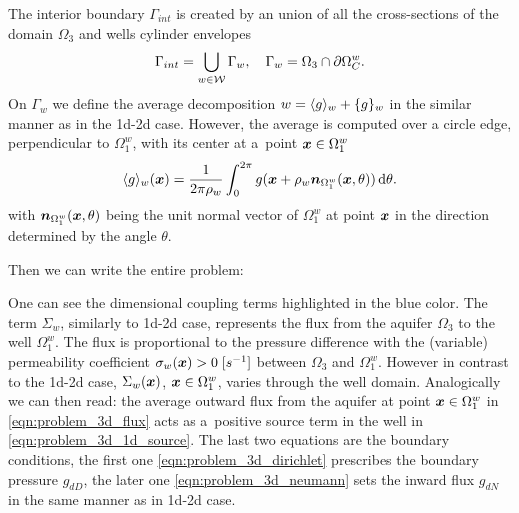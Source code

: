 The interior boundary $\Gamma_{int}$ is created by an union of all the cross-sections of the domain $\Omega_3$
and wells cylinder envelopes
\[
    \Gamma_{int} = \bigcup_{\substack{w\in\mathcal{W}}} \Gamma_w, \quad \Gamma_w = \Omega_3 \cap \partial\Omega^w_C.
\]
On $\Gamma_w$ we define the average decomposition $w = \langle g\rangle_w + \{g\}_w$ in the similar manner
as in the 1d-2d case. However, the average is computed over a circle edge, perpendicular to $\Omega^w_1$,
with its center at a~point $\mathbf{\boldsymbol{x}}\in \Omega^w_1$
\begin{equation} \label{eqn:average_definition_3d}
    \langle g\rangle_w(\mathbf{\boldsymbol{x}}) = \frac{1}{2\pi\rho_w} \int_0^{2\pi} g (\mathbf{\boldsymbol{x}} + \rho_w \mathbf{\boldsymbol{n}}_{\Omega^w_1}(\mathbf{\boldsymbol{x}},\theta)) \,{\rm d} \theta.
\end{equation}
with $\mathbf{\boldsymbol{n}}_{\Omega^w_1}(\mathbf{\boldsymbol{x}},\theta)$ being the unit normal vector of $\Omega^w_1$ at point $\mathbf{\boldsymbol{x}}$ in the direction
determined by the angle $\theta$.

Then we can write the entire problem:

One can see the dimensional coupling terms highlighted in the blue color.
The term $\Sigma_w$, similarly to 1d-2d case, represents the flux from the aquifer $\Omega_3$ to the well $\Omega^w_1$.
The flux is proportional to the pressure difference with the (variable) permeability coefficient $\sigma_w(\mathbf{\boldsymbol{x}})>0\;[s^{-1}]$ between $\Omega_3$ and $\Omega^w_1$.
However in contrast to the 1d-2d case, $\Sigma_w(\mathbf{\boldsymbol{x}})$, $\mathbf{\boldsymbol{x}}\in\Omega^w_1$, varies through the well domain.
Analogically we can then read: the average outward flux from the aquifer at point $\mathbf{\boldsymbol{x}}\in\Omega^w_1$
in \eqref{eqn:problem_3d_flux} acts as a~positive source term in the well in \eqref{eqn:problem_3d_1d_source}.
The last two equations are the boundary conditions, the first one \eqref{eqn:problem_3d_dirichlet} prescribes the boundary pressure $g_{dD}$, 
the later one \eqref{eqn:problem_3d_neumann} sets the inward flux $g_{dN}$ in the same manner as in 1d-2d case.

